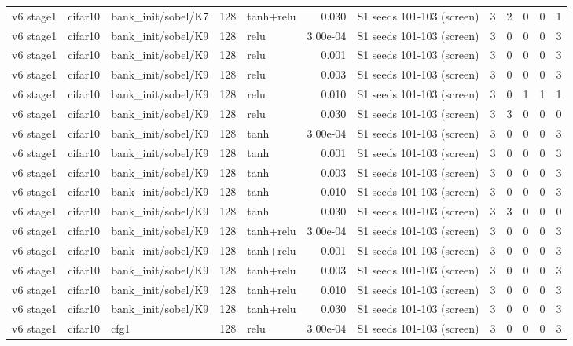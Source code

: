 \begin{table}[htbp]
{\begin{tabular}{@{}lllrlrlrrrrr@{}}
v6 stage1 & cifar10 & bank\_init/sobel/K7 & 128 & tanh+relu & 0.030 & S1 seeds 101-103 (screen) & 3 & 2 & 0 & 0 & 1 \\
v6 stage1 & cifar10 & bank\_init/sobel/K9 & 128 & relu & 3.00e-04 & S1 seeds 101-103 (screen) & 3 & 0 & 0 & 0 & 3 \\
v6 stage1 & cifar10 & bank\_init/sobel/K9 & 128 & relu & 0.001 & S1 seeds 101-103 (screen) & 3 & 0 & 0 & 0 & 3 \\
v6 stage1 & cifar10 & bank\_init/sobel/K9 & 128 & relu & 0.003 & S1 seeds 101-103 (screen) & 3 & 0 & 0 & 0 & 3 \\
v6 stage1 & cifar10 & bank\_init/sobel/K9 & 128 & relu & 0.010 & S1 seeds 101-103 (screen) & 3 & 0 & 1 & 1 & 1 \\
v6 stage1 & cifar10 & bank\_init/sobel/K9 & 128 & relu & 0.030 & S1 seeds 101-103 (screen) & 3 & 3 & 0 & 0 & 0 \\
v6 stage1 & cifar10 & bank\_init/sobel/K9 & 128 & tanh & 3.00e-04 & S1 seeds 101-103 (screen) & 3 & 0 & 0 & 0 & 3 \\
v6 stage1 & cifar10 & bank\_init/sobel/K9 & 128 & tanh & 0.001 & S1 seeds 101-103 (screen) & 3 & 0 & 0 & 0 & 3 \\
v6 stage1 & cifar10 & bank\_init/sobel/K9 & 128 & tanh & 0.003 & S1 seeds 101-103 (screen) & 3 & 0 & 0 & 0 & 3 \\
v6 stage1 & cifar10 & bank\_init/sobel/K9 & 128 & tanh & 0.010 & S1 seeds 101-103 (screen) & 3 & 0 & 0 & 0 & 3 \\
v6 stage1 & cifar10 & bank\_init/sobel/K9 & 128 & tanh & 0.030 & S1 seeds 101-103 (screen) & 3 & 3 & 0 & 0 & 0 \\
v6 stage1 & cifar10 & bank\_init/sobel/K9 & 128 & tanh+relu & 3.00e-04 & S1 seeds 101-103 (screen) & 3 & 0 & 0 & 0 & 3 \\
v6 stage1 & cifar10 & bank\_init/sobel/K9 & 128 & tanh+relu & 0.001 & S1 seeds 101-103 (screen) & 3 & 0 & 0 & 0 & 3 \\
v6 stage1 & cifar10 & bank\_init/sobel/K9 & 128 & tanh+relu & 0.003 & S1 seeds 101-103 (screen) & 3 & 0 & 0 & 0 & 3 \\
v6 stage1 & cifar10 & bank\_init/sobel/K9 & 128 & tanh+relu & 0.010 & S1 seeds 101-103 (screen) & 3 & 0 & 0 & 0 & 3 \\
v6 stage1 & cifar10 & bank\_init/sobel/K9 & 128 & tanh+relu & 0.030 & S1 seeds 101-103 (screen) & 3 & 0 & 0 & 0 & 3 \\
v6 stage1 & cifar10 & cfg1 & 128 & relu & 3.00e-04 & S1 seeds 101-103 (screen) & 3 & 0 & 0 & 0 & 3 \\

\end{tabular}}
\end{table}
